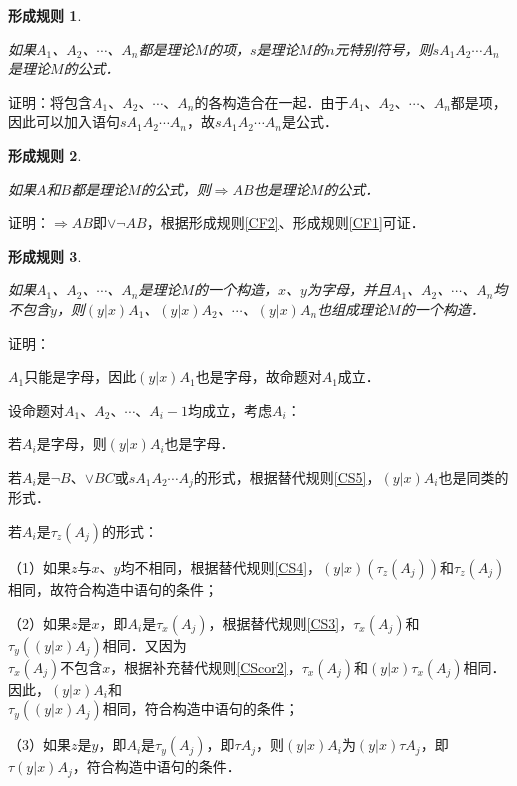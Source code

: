 \documentclass[12pt, a4paper, oneside]{book}
\newtheorem{CF}{形成规则}
\begin{document}
			\begin{CF}\label{CF4}
				\hfill\par
				如果$A_1$、$A_2$、$\cdots$、$A_n$都是理论$M$的项，$s$是理论$M$的$n$元特别符号，则$sA_1A_2\cdots A_n$是理论$M$的公式．
			\end{CF}
			证明：将包含$A_1$、$A_2$、$\cdots$、$A_n$的各构造合在一起．由于$A_1$、$A_2$、$\cdots$、$A_n$都是项，因此可以加入语句$sA_1A_2\cdots A_n$，故$sA_1A_2\cdots A_n$是公式．

			\begin{CF}\label{CF5}
				\hfill\par
				如果$A$和$B$都是理论$M$的公式，则$\Rightarrow AB$也是理论$M$的公式．
			\end{CF}
			证明：$\Rightarrow AB$即$\lor\neg AB$，根据形成规则\ref{CF2}、形成规则\ref{CF1}可证．

			\begin{CF}\label{CF6}
				\hfill\par
				如果$A_1$、$A_2$、$\cdots$、$A_n$是理论$M$的一个构造，$x$、$y$为字母，并且$A_1$、$A_2$、$\cdots$、$A_n$均不包含$y$，则$(y|x)A_1$、$(y|x)A_2$、$\cdots$、$(y|x)A_n$也组成理论$M$的一个构造．
			\end{CF}
			证明：
			\par
			$A_1$只能是字母，因此$(y|x)A_1$也是字母，故命题对$A_1$成立．
			\par
			设命题对$A_1$、$A_2$、$\cdots$、$A_i-1$均成立，考虑$A_i$：
			\par
			若$A_i$是字母，则$(y|x)A_i$也是字母．
			\par
			若$A_i$是$\neg B$、$\lor BC$或$sA_1A_2\cdots A_j$的形式，根据替代规则\ref{CS5}，$(y|x)A_i$也是同类的形式．
			\par
			若$A_i$是$\tau_z(A_j)$的形式：
			\par
			（1）如果$z$与$x$、$y$均不相同，根据替代规则\ref{CS4}，$(y|x)(\tau_z(A_j))$和$\tau_z(A_j)$相同，故符合构造中语句的条件；
			\par
			（2）如果$z$是$x$，即$A_i$是$\tau_x(A_j)$，根据替代规则\ref{CS3}，$\tau_x(A_j)$和$\tau_y((y|x)A_j)$相同．又因为\\$\tau_x(A_j)$不包含$x$，根据补充替代规则\ref{CScor2}，$\tau_x(A_j)$和$(y|x)\tau_x(A_j)$相同．因此，$(y|x)A_i$和\\$\tau_y((y|x)A_j)$相同，符合构造中语句的条件；
			\par
			（3）如果$z$是$y$，即$A_i$是$\tau_y(A_j)$，即$\tau A_j$，则$(y|x)A_i$为$(y|x)\tau A_j$，即$\tau(y|x)A_j$，符合构造中语句的条件．
			
\end{document}
